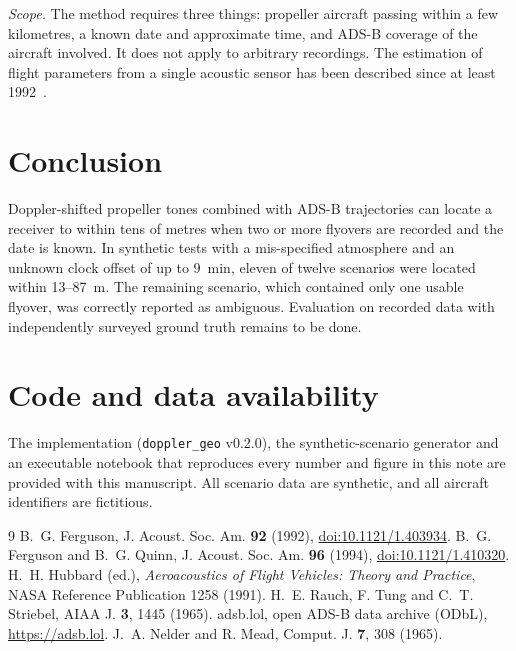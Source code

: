\documentclass[10pt,twocolumn,letterpaper]{article}
\begin{document}
\emph{Scope.} The method requires three things: propeller aircraft passing within a few kilometres, a known date and
approximate time, and ADS-B coverage of the aircraft involved. It does not apply to arbitrary recordings. The
estimation of flight parameters from a single acoustic sensor has been described since at least
1992~\cite{ferguson1992,ferguson1994}.

\FloatBarrier
\section{Conclusion}
Doppler-shifted propeller tones combined with ADS-B trajectories can locate a receiver to within tens of metres when
two or more flyovers are recorded and the date is known. In synthetic tests with a mis-specified atmosphere and an
unknown clock offset of up to 9~min, eleven of twelve scenarios were located within 13--87~m. The remaining
scenario, which contained only one usable flyover, was correctly reported as ambiguous. Evaluation on recorded data
with independently surveyed ground truth remains to be done.

\section*{Code and data availability}
The implementation (\texttt{doppler\_geo} v0.2.0), the synthetic-scenario generator and an executable notebook that
reproduces every number and figure in this note are provided with this manuscript. All scenario data are synthetic,
and all aircraft identifiers are fictitious.

\small
\begin{thebibliography}{9}\setlength{\itemsep}{1pt}
 B.~G. Ferguson, J. Acoust. Soc. Am. \textbf{92} (1992),
  \href{https://doi.org/10.1121/1.403934}{doi:10.1121/1.403934}.
 B.~G. Ferguson and B.~G. Quinn, J. Acoust. Soc. Am. \textbf{96} (1994),
  \href{https://doi.org/10.1121/1.410320}{doi:10.1121/1.410320}.
 H.~H. Hubbard (ed.), \emph{Aeroacoustics of Flight Vehicles: Theory and Practice}, NASA
  Reference Publication 1258 (1991).
 H.~E. Rauch, F. Tung and C.~T. Striebel, AIAA J. \textbf{3}, 1445 (1965).
 adsb.lol, open ADS-B data archive (ODbL), \url{https://adsb.lol}.
 J.~A. Nelder and R. Mead, Comput. J. \textbf{7}, 308 (1965).
\end{thebibliography}
\end{document}
